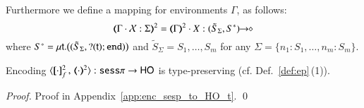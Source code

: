 \begin{remark}\rm
	Furthermore we define a mapping for environments $\Gamma$, as follows:
	\[
		\tmap{\Gamma \cat \rvar{X}:\Sigma}{2} = \tmap{\Gamma}{2} \cat X:\shot{(\tilde{S}_{\Sigma}, S^*)}
	\]
	where
	$S^* = \mu\mathsf{t}.\big((\tilde{S}_{\Sigma}, ? (\mathsf{t}) ;\mathtt{end})\big)$
	and
	$\tilde{S}_{\Sigma} = S_1, \ldots, S_m$ for any $\Sigma = \{n_1:S_1, \ldots, n_m:S_m\}$.
\end{remark}

\begin{proposition}\rm
	Encoding $\fencod{\cdot}{\cdot}{2}{f}: \sesp \to \HO$  
	is type-preserving (cf. Def.~\ref{def:ep}\,(1)).
\end{proposition}

\begin{proof}
	Proof in Appendix~\ref{app:enc_sesp_to_HO_t}.
	\qed
\end{proof}

